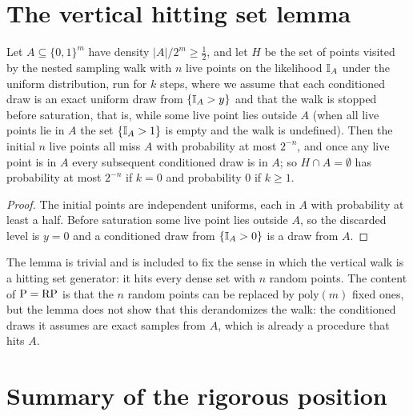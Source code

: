 \section{The vertical hitting set lemma}

\begin{lemma}
Let $A \subseteq \{0,1\}^m$ have density $|A| / 2^m \ge \tfrac12$, and let $H$ be the set of points visited by the nested sampling walk with $n$ live points on the likelihood $\mathbb{I}_A$ under the uniform distribution, run for $k$ steps, where we assume that each conditioned draw is an exact uniform draw from $\{ \mathbb{I}_A > y \}$ and that the walk is stopped before saturation, that is, while some live point lies outside $A$ (when all live points lie in $A$ the set $\{ \mathbb{I}_A > 1 \}$ is empty and the walk is undefined). Then the initial $n$ live points all miss $A$ with probability at most $2^{-n}$, and once any live point is in $A$ every subsequent conditioned draw is in $A$; so $H \cap A = \emptyset$ has probability at most $2^{-n}$ if $k = 0$ and probability $0$ if $k \ge 1$.
\end{lemma}

\begin{proof}
The initial points are independent uniforms, each in $A$ with probability at least a half. Before saturation some live point lies outside $A$, so the discarded level is $y = 0$ and a conditioned draw from $\{ \mathbb{I}_A > 0 \}$ is a draw from $A$.
\end{proof}

The lemma is trivial and is included to fix the sense in which the vertical walk is a hitting set generator: it hits every dense set with $n$ random points. The content of $\mathrm{P} = \mathrm{RP}$ is that the $n$ random points can be replaced by $\mathrm{poly}(m)$ fixed ones, but the lemma does not show that this derandomizes the walk: the conditioned draws it assumes are exact samples from $A$, which is already a procedure that hits $A$.

\section{Summary of the rigorous position}

